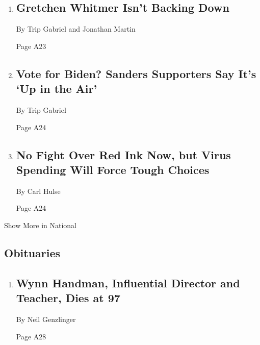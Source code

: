 \begin{enumerate}
\def\labelenumi{\arabic{enumi}.}
\item
  \href{/2020/04/18/us/politics/gretchen-whitmer-michigan-protests.html}{}

  \hypertarget{gretchen-whitmer-isnt-backing-down-1}{%
  \subsection{Gretchen Whitmer Isn't Backing
  Down}\label{gretchen-whitmer-isnt-backing-down-1}}

  By Trip Gabriel and Jonathan Martin

  Page A23
\item
  \href{/2020/04/18/us/politics/bernie-sanders-voters-biden.html}{}

  \hypertarget{vote-for-biden-sanders-supporters-say-its-up-in-the-air}{%
  \subsection{Vote for Biden? Sanders Supporters Say It's `Up in the
  Air'}\label{vote-for-biden-sanders-supporters-say-its-up-in-the-air}}

  By Trip Gabriel

  Page A24
\item
  \href{/2020/04/18/us/coronavirus-deficits-spending.html}{}

  \hypertarget{no-fight-over-red-ink-now-but-virus-spending-will-force-tough-choices}{%
  \subsection{No Fight Over Red Ink Now, but Virus Spending Will Force
  Tough
  Choices}\label{no-fight-over-red-ink-now-but-virus-spending-will-force-tough-choices}}

  By Carl Hulse

  Page A24
\end{enumerate}

Show More in National

\hypertarget{obituaries}{%
\subsection{Obituaries}\label{obituaries}}

\begin{enumerate}
\def\labelenumi{\arabic{enumi}.}
\item
  \href{/2020/04/14/theater/wynn-handman-dead-coronavirus.html}{}

  \hypertarget{wynn-handman-influential-director-and-teacher-dies-at-97}{%
  \subsection{Wynn Handman, Influential Director and Teacher, Dies at
  97}\label{wynn-handman-influential-director-and-teacher-dies-at-97}}

  By Neil Genzlinger

  Page A28
\end{enumerate}

